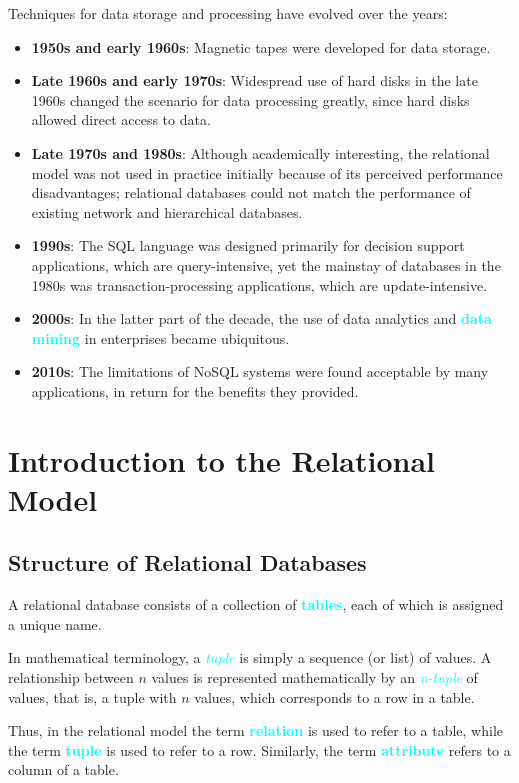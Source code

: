 \documentclass[a4paper,12pt,twoside,openany]{book}
\newcommand{\textcy}[1]{\textbf{\textcolor{cyan}{#1}}}
\newcommand{\textcyi}[1]{\textit{\textcolor{cyan}{#1}}}
\begin{document}
Techniques for data storage and processing have evolved over the years:
\begin{itemize}
    \item\textbf{1950s and early 1960s}: Magnetic tapes were developed for data storage.
    \item\textbf{Late 1960s and early 1970s}: Widespread use of hard disks in the late 1960s changed the scenario for data processing greatly, since hard disks allowed direct access to data.
    \item\textbf{Late 1970s and 1980s}: Although academically interesting, the relational model was not used in practice initially because of its perceived performance disadvantages; relational databases could not match the performance of existing network and hierarchical databases.
    \item\textbf{1990s}: The SQL language was designed primarily for decision support applications, which are query-intensive, yet the mainstay of databases in the 1980s was transaction-processing applications, which are update-intensive.
    \item\textbf{2000s}: In the latter part of the decade, the use of data analytics and \textcy{data mining} in enterprises became ubiquitous.
    \item\textbf{2010s}: The limitations of NoSQL systems were found acceptable by many applications, in return for the benefits they provided.
\end{itemize}

\chapter{Introduction to the Relational Model}
\section{Structure of Relational Databases}

A relational database consists of a collection of \textcy{tables}, each of which is assigned a unique name.

In mathematical terminology, a \textcyi{tuple} is simply a sequence (or list) of values. A relationship between $n$ values is represented mathematically by an \textcyi{n-tuple} of values, that is, a tuple with $n$ values, which corresponds to a row in a table.

Thus, in the relational model the term \textcy{relation} is used to refer to a table, while the term \textcy{tuple} is used to refer to a row. Similarly, the term \textcy{attribute} refers to a column of a table.
\end{document}
